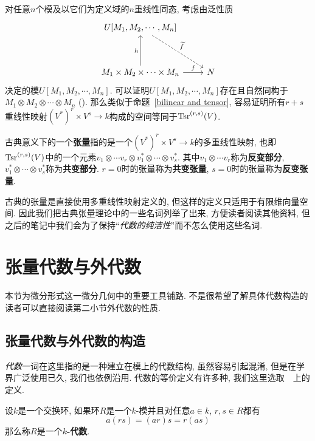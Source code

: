 \begin{rem}
    对任意$n$个模及以它们为定义域的$n$重线性同态, 考虑由泛性质
    \[\begin{tikzcd}[row sep=huge]
        U[M_1,M_2,\cdots,M_n] \arrow[dr, dashed, "\widetilde{f}"] & \\
        M_1\times M_2\times\cdots\times M_n \arrow[r, "f"] \arrow[u, "h"] & N
    \end{tikzcd}\]
    决定的模$U[M_1,M_2,\cdots,M_n]$.
    可以证明$U[M_1,M_2,\cdots,M_n]$存在且自然同构于$M_1\otimes M_2\otimes\cdots\otimes M_n$ (\parencite[命题B-5.17, B-5.18]{Rotman_AdvMdnAlg}).
    那么类似于命题~\ref{bilinear and tensor}, 容易证明所有$r+s$重线性映射$(V^*)^r\times V^s\to k$构成的空间等同于$\operatorname{Tsr}^{(r,s)}(V)$.

    古典意义下的一个\textbf{张量}指的是一个$(V^*)^r\times V^s\to k$的多重线性映射, 也即$\operatorname{Tsr}^{(r,s)}(V)$中的一个元素$v_1\otimes\cdots v_r\otimes v^*_1\otimes\cdots\otimes v^*_s$.
    其中$v_1\otimes\cdots v_r$称为\textbf{反变部分}, $v^*_1\otimes\cdots\otimes v^*_s$称为\textbf{共变部分}.
    $r=0$时的张量称为\textbf{共变张量}, $s=0$时的张量称为\textbf{反变张量}.

    古典的张量是直接使用多重线性映射定义的, 但这样的定义只适用于有限维向量空间.
    因此我们把古典张量理论中的一些名词列举了出来, 方便读者阅读其他资料, 但之后的笔记中我们会为了保持``\textit{代数的纯洁性}''而不怎么使用这些名词.
\end{rem}

\section{张量代数与外代数}
本节为微分形式这一微分几何中的重要工具铺路.
不是很希望了解具体代数构造的读者可以直接阅读第二小节外代数的性质.
\subsection*{张量代数与外代数的构造}
\textit{代数}一词在这里指的是一种建立在模上的代数结构, 虽然容易引起混淆, 但是在学界广泛使用已久, 我们也依例沿用.
代数的等价定义有许多种, 我们这里选取~\parencite{Rotman_AdvMdnAlg}~上的定义.

\begin{defn}
    设$k$是一个交换环, 如果环$R$是一个$k$-模并且对任意$a\in k$, $r,s\in R$都有
    \begin{equation}
        a(rs)=(ar)s=r(as)\label{def of alg}
    \end{equation}
    那么称$R$是一个\textbf{$k$-代数}.
\end{defn}

